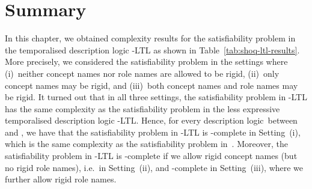 \section{Summary}\label{sec:shoq-ltl-summary}

In this chapter, we obtained complexity results for the satisfiability problem
in the temporalised description logic \SHOQ-LTL as shown in
Table~\ref{tab:shoq-ltl-results}.  More precisely, we considered the
satisfiability problem in the settings where (i)~neither concept names nor role
names are allowed to be rigid, (ii)~only concept names may be rigid, and
(iii)~both concept names and role names may be rigid.  It turned out that in all
three settings, the satisfiability problem in \SHOQ-LTL has the same complexity
as the satisfiability problem in the less expressive temporalised description
logic \ALC-LTL\@.  Hence, for every description logic~\Lmc between \ALC and
\SHOQ, we have that the satisfiability problem in \Lmc-LTL is \ExpTime-complete
in Setting~(i), which is the same complexity as the satisfiability problem
in~\Lmc.  Moreover, the satisfiability problem in \Lmc-LTL is \NExpTime-complete
if we allow rigid concept names (but no rigid role names), i.e.~in Setting~(ii),
and \TwoExpTime-complete in Setting~(iii), where we further allow rigid role
names.
